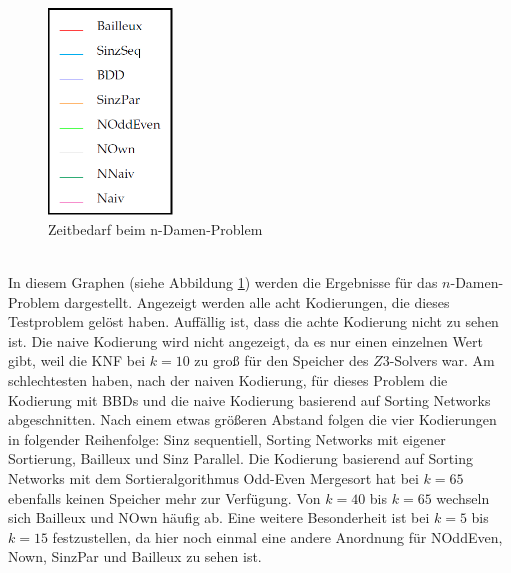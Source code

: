\documentclass[a4,abstract=on]{scrartcl}
\begin{document}
\begin{figure}[htbp!]
\includegraphics[width=3.3cm]{legende.png}
\caption{Zeitbedarf beim n-Damen-Problem}
\label{fig:damen}
\end{figure}
\ \\
In diesem Graphen (siehe Abbildung \ref{fig:damen}) werden die Ergebnisse für das $n$-Damen-Problem dargestellt. Angezeigt werden alle acht Kodierungen, die dieses Testproblem gelöst haben. Auffällig ist, dass die achte Kodierung nicht zu sehen ist. Die naive Kodierung wird nicht angezeigt, da es nur einen einzelnen Wert gibt, weil die KNF bei $k=10$ zu groß für den Speicher des $Z3$-Solvers war. Am schlechtesten haben, nach der naiven Kodierung, für dieses Problem die Kodierung mit BBDs und die naive Kodierung basierend auf Sorting Networks abgeschnitten. Nach einem etwas größeren Abstand folgen die vier Kodierungen in folgender Reihenfolge: Sinz sequentiell, Sorting Networks mit eigener Sortierung, Bailleux und Sinz Parallel. Die Kodierung basierend auf Sorting Networks mit dem Sortieralgorithmus Odd-Even Mergesort hat bei $k=65$ ebenfalls keinen Speicher mehr zur Verfügung. Von $k=40$ bis $k=65$ wechseln sich Bailleux und NOwn häufig ab. Eine weitere Besonderheit ist bei $k=5$ bis $k=15$ festzustellen, da hier noch einmal eine andere Anordnung für NOddEven, Nown, SinzPar und Bailleux zu sehen ist. 

\FloatBarrier
\end{document}
